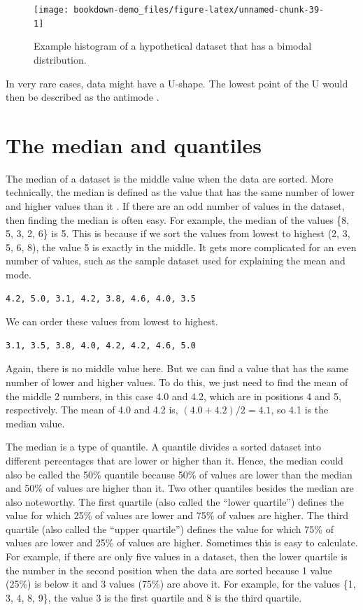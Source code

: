 \documentclass[
]{scrbook}
\begin{document}
\begin{figure}
\texttt{[image: bookdown-demo\_files/figure-latex/unnamed-chunk-39-1]} \caption{Example histogram of a hypothetical dataset that has a bimodal distribution.}\label{fig:unnamed-chunk-39}
\end{figure}

In very rare cases, data might have a U-shape.
The lowest point of the U would then be described as the antimode \citep{Sokal1995}.

\hypertarget{the-median-and-quantiles}{%
\section{The median and quantiles}\label{the-median-and-quantiles}}

The median of a dataset is the middle value when the data are sorted.
More technically, the median is defined as the value that has the same number of lower and higher values than it \citep{Sokal1995}.
If there are an odd number of values in the dataset, then finding the median is often easy.
For example, the median of the values \{8, 5, 3, 2, 6\} is 5.
This is because if we sort the values from lowest to highest (2, 3, 5, 6, 8), the value 5 is exactly in the middle.
It gets more complicated for an even number of values, such as the sample dataset used for explaining the mean and mode.

\begin{verbatim}
4.2, 5.0, 3.1, 4.2, 3.8, 4.6, 4.0, 3.5
\end{verbatim}

We can order these values from lowest to highest.

\begin{verbatim}
3.1, 3.5, 3.8, 4.0, 4.2, 4.2, 4.6, 5.0
\end{verbatim}

Again, there is no middle value here.
But we can find a value that has the same number of lower and higher values.
To do this, we just need to find the mean of the middle 2 numbers, in this case 4.0 and 4.2, which are in positions 4 and 5, respectively.
The mean of 4.0 and 4.2 is, \((4.0 + 4.2)/2 = 4.1\), so 4.1 is the median value.

The median is a type of quantile.
A quantile divides a sorted dataset into different percentages that are lower or higher than it.
Hence, the median could also be called the 50\% quantile because 50\% of values are lower than the median and 50\% of values are higher than it.
Two other quantiles besides the median are also noteworthy.
The first quartile (also called the ``lower quartile'') defines the value for which 25\% of values are lower and 75\% of values are higher.
The third quartile (also called the ``upper quartile'') defines the value for which 75\% of values are lower and 25\% of values are higher.
Sometimes this is easy to calculate.
For example, if there are only five values in a dataset, then the lower quartile is the number in the second position when the data are sorted because 1 value (25\%) is below it and 3 values (75\%) are above it.
For example, for the values \{1, 3, 4, 8, 9\}, the value 3 is the first quartile and 8 is the third quartile.
\end{document}

